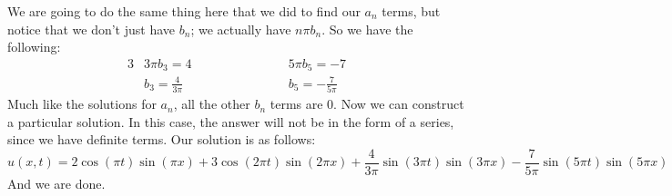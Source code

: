 \documentclass{article}
\begin{document}
\noindent We are going to do the same thing here that we did to find our $a_{n}$ terms, but notice that we don't just have $b_{n}$; we actually have $n\pi b_{n}$. So we have the following:
\begin{alignat*}{3}
&3\pi b_{3} = 4 \qquad \qquad \qquad &&5\pi b_{5} = -7\\
&b_{3} = \frac{4}{3\pi} &&b_{5} = -\frac{7}{5\pi}
\end{alignat*}
\noindent Much like the solutions for $a_{n}$, all the other $b_{n}$ terms are 0. Now we can construct a particular solution. In this case, the answer will not be in the form of a series, since we have definite terms. Our solution is as follows:
\[
u(x,t) = 2\cos{(\pi t)}\sin{(\pi x)} + 3\cos{(2\pi t)}\sin{(2\pi x)} + \frac{4}{3\pi}\sin{(3\pi t)}\sin{(3\pi x)} - \frac{7}{5\pi}\sin{(5\pi t)}\sin{(5\pi x)}
\]
\noindent And we are done.
\end{document}
